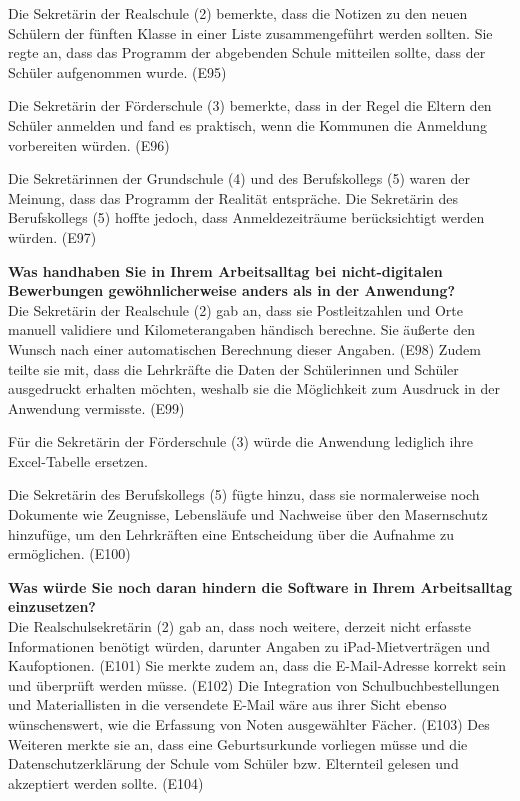 Die Sekretärin der Realschule (2) bemerkte, dass die Notizen zu den neuen Schülern der fünften Klasse in einer Liste zusammengeführt werden sollten. Sie regte an, dass das Programm der abgebenden Schule mitteilen sollte, dass der Schüler aufgenommen wurde. (E95)

Die Sekretärin der Förderschule (3) bemerkte, dass in der Regel die Eltern den Schüler anmelden und fand es praktisch, wenn die Kommunen die Anmeldung vorbereiten würden. (E96)

Die Sekretärinnen der Grundschule (4) und des Berufskollegs (5) waren der Meinung, dass das Programm der Realität entspräche. Die Sekretärin des Berufskollegs (5) hoffte jedoch, dass Anmeldezeiträume berücksichtigt werden würden. (E97)

\textbf{Was handhaben Sie in Ihrem Arbeitsalltag bei nicht-digitalen Bewerbungen gewöhnlicherweise anders als in der Anwendung?}\\
Die Sekretärin der Realschule (2) gab an, dass sie Postleitzahlen und Orte manuell validiere und Kilometerangaben händisch berechne. Sie äußerte den Wunsch nach einer automatischen Berechnung dieser Angaben. (E98) Zudem teilte sie mit, dass die Lehrkräfte die Daten der Schülerinnen und Schüler ausgedruckt erhalten möchten, weshalb sie die Möglichkeit zum Ausdruck in der Anwendung vermisste. (E99)

Für die Sekretärin der Förderschule (3) würde die Anwendung lediglich ihre Excel-Tabelle ersetzen.

Die Sekretärin des Berufskollegs (5) fügte hinzu, dass sie normalerweise noch Dokumente wie Zeugnisse, Lebensläufe und Nachweise über den Masernschutz hinzufüge, um den Lehrkräften eine Entscheidung über die Aufnahme zu ermöglichen. (E100)

\textbf{Was würde Sie noch daran hindern die Software in Ihrem Arbeitsalltag einzusetzen?}\\
Die Realschulsekretärin (2) gab an, dass noch weitere, derzeit nicht erfasste Informationen benötigt würden, darunter Angaben zu iPad-Mietverträgen und Kaufoptionen. (E101) Sie merkte zudem an, dass die E-Mail-Adresse korrekt sein und überprüft werden müsse. (E102) Die Integration von Schulbuchbestellungen und Materiallisten in die versendete E-Mail wäre aus ihrer Sicht ebenso wünschenswert, wie die Erfassung von Noten ausgewählter Fächer. (E103) Des Weiteren merkte sie an, dass eine Geburtsurkunde vorliegen müsse und die Datenschutzerklärung der Schule vom Schüler bzw. Elternteil gelesen und akzeptiert werden sollte. (E104)

